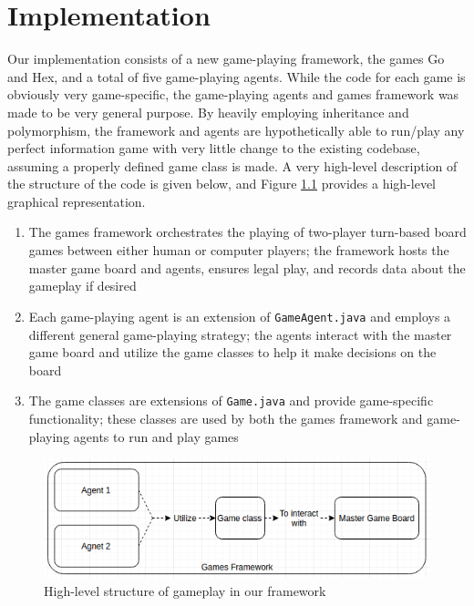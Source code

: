 %
%
%
\chapter{Implementation} \label{ch:method}
Our implementation consists of a new game-playing framework, the games Go and Hex, and a total of five game-playing agents.  While the code for each game is obviously very game-specific, the game-playing agents and games framework was made to be very general purpose.  By heavily employing inheritance and polymorphism, the framework and agents are hypothetically able to run/play any perfect information game with very little change to the existing codebase, assuming a properly defined game class is made.  A very high-level description of the structure of the code is given below, and Figure \ref{fig:highframe} provides a high-level graphical representation.

\begin{enumerate}
\item The games framework orchestrates the playing of two-player turn-based board games between either human or computer players; the framework hosts the master game board and agents, ensures legal play, and records data about the gameplay if desired
\item Each game-playing agent is an extension of \texttt{GameAgent.java} and employs a different general game-playing strategy; the agents interact with the master game board and utilize the game classes to help it make decisions on the board
\item The game classes are extensions of \texttt{Game.java} and provide game-specific functionality; these classes are used by both the games framework and game-playing agents to run and play games
\end{enumerate}

\begin{figure}[h]
\centering
\includegraphics[scale=0.6]{images/highlevelframe.png}
\caption{High-level structure of gameplay in our framework}
\label{fig:highframe}
\end{figure}

